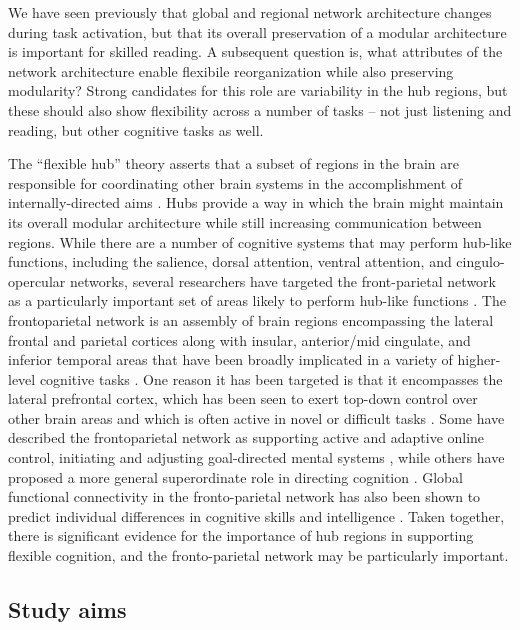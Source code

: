 We have seen previously that global and regional network architecture changes during task activation, but that its overall preservation of a modular architecture is important for skilled reading. A subsequent question is, what attributes of the network architecture enable flexibile reorganization while also preserving modularity? Strong candidates for this role are variability in the hub regions, but these should also show flexibility across a number of tasks -- not just listening and reading, but other cognitive tasks as well. 

The ``flexible hub'' theory asserts that a subset of regions in the brain are responsible for coordinating other brain systems in the accomplishment of internally-directed aims \citep{Cole2007}. Hubs provide a way in which the brain might maintain its overall modular architecture while still increasing communication between regions. While there are a number of cognitive systems that may perform hub-like functions, including the salience, dorsal attention, ventral attention, and cingulo-opercular networks, several researchers have targeted the front-parietal network as a particularly important set of areas likely to perform hub-like functions \citep{Cole2013, Niendam2012}. The frontoparietal network is an assembly of brain regions encompassing the lateral frontal and parietal cortices along with insular, anterior/mid cingulate, and inferior temporal areas that have been broadly implicated in a variety of higher-level cognitive tasks \citep{Fedorenko2013}. One reason it has been targeted is that it encompasses the lateral prefrontal cortex, which has been seen to exert top-down control over other brain areas and which is often active in novel or difficult tasks \citep{Duncan2010}. Some have described the frontoparietal network as supporting active and adaptive online control, initiating and adjusting goal-directed mental systems \citep{Dosenbach2007}, while others have proposed a more general superordinate role in directing cognition \citep{Niendam2012}.  Global functional connectivity in the fronto-parietal network has also been shown to predict individual differences in cognitive skills and intelligence \citep{Cole2012}. Taken together, there is significant evidence for the importance of hub regions in supporting flexible cognition, and the fronto-parietal network may be particularly important. 


\subsection{Study aims}

